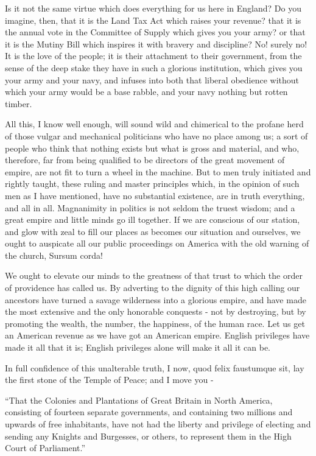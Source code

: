 Is it not the same virtue which does everything for us here in England? Do you imagine, then, that it is the Land Tax Act which raises your revenue? that it is the annual vote in the Committee of Supply which gives you your army? or that it is the Mutiny Bill which inspires it with bravery and discipline? No! surely no! It is the love of the people; it is their attachment to their government, from the sense of the deep stake they have in such a glorious institution, which gives you your army and your navy, and infuses into both that liberal obedience without which your army would be a base rabble, and your navy nothing but rotten timber.\par

All this, I know well enough, will sound wild and chimerical to the profane herd of those vulgar and mechanical politicians who have no place among us; a sort of people who think that nothing exists but what is gross and material, and who, therefore, far from being qualified to be directors of the great movement of empire, are not fit to turn a wheel in the machine. But to men truly initiated and rightly taught, these ruling and master principles which, in the opinion of such men as I have mentioned, have no substantial existence, are in truth everything, and all in all. Magnanimity in politics is not seldom the truest wisdom; and a great empire and little minds go ill together. If we are conscious of our station, and glow with zeal to fill our places as becomes our situation and ourselves, we ought to auspicate all our public proceedings on America with the old warning of the church, Sursum corda!\par

We ought to elevate our minds to the greatness of that trust to which the order of providence has called us. By adverting to the dignity of this high calling our ancestors have turned a savage wilderness into a glorious empire, and have made the most extensive and the only honorable conquests - not by destroying, but by promoting the wealth, the number, the happiness, of the human race. Let us get an American revenue as we have got an American empire. English privileges have made it all that it is; English privileges alone will make it all it can be.\par

In full confidence of this unalterable truth, I now, quod felix faustumque sit, lay the first stone of the Temple of Peace; and I move you -\par

“That the Colonies and Plantations of Great Britain in North America, consisting of fourteen separate governments, and containing two millions and upwards of free inhabitants, have not had the liberty and privilege of electing and sending any Knights and Burgesses, or others, to represent them in the High Court of Parliament.”\par

\endgroup

